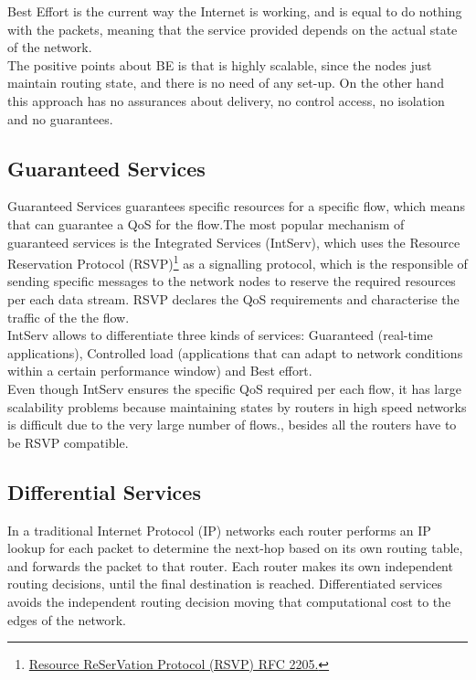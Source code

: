 Best Effort is the current way the Internet is working, and is equal to do nothing with the packets, meaning that the service provided depends on the actual state of the network.\\

The positive points about BE is that is highly scalable, since the nodes just maintain routing state, and there is no need of any set-up. On the other hand this approach has no assurances about delivery, no control access, no isolation and no guarantees. \\

\subsection{Guaranteed Services\\}
\label{sec:intserv}

Guaranteed Services guarantees specific resources for a specific flow, which means that can guarantee a QoS for the flow.The most popular mechanism of guaranteed services is the Integrated Services (IntServ), which uses the Resource Reservation Protocol (RSVP)\footnote{\href{http://tools.ietf.org/html/rfc2205}{Resource ReSerVation Protocol (RSVP) RFC 2205.}} as a signalling protocol, which is the responsible of sending specific messages to the network nodes to reserve the required resources per each data stream. RSVP declares the QoS requirements and characterise the traffic of the the flow.\\ 

IntServ allows to differentiate three kinds of services: Guaranteed (real-time applications), Controlled load (applications that can adapt to network conditions within a certain performance window) and Best effort.\\

Even though IntServ ensures the specific QoS required per each flow, it has large scalability problems because maintaining states by routers in high speed networks is difficult due to the very large number of flows., besides all the routers have to be RSVP compatible.\\   

\subsection{Differential Services\\}
\label{sec:diffserv}

In a traditional Internet Protocol (IP) networks each router performs an IP lookup for each packet to determine the next-hop based on its own routing table, and forwards the packet to that router. Each router makes its own independent routing decisions, until the final destination is reached. Differentiated services avoids the independent routing decision moving that computational cost to the edges of the network.\\

